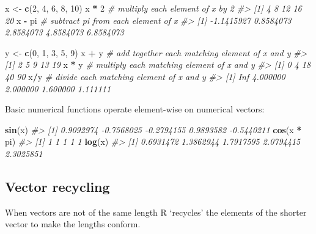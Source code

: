 \documentclass[]{book}
\newenvironment{Shaded}{\begin{snugshade}}{\end{snugshade}}
\newcommand{\CommentTok}[1]{\textcolor[rgb]{0.56,0.35,0.01}{\textit{#1}}}
\newcommand{\DecValTok}[1]{\textcolor[rgb]{0.00,0.00,0.81}{#1}}
\newcommand{\KeywordTok}[1]{\textcolor[rgb]{0.13,0.29,0.53}{\textbf{#1}}}
\newcommand{\NormalTok}[1]{#1}
\newcommand{\OperatorTok}[1]{\textcolor[rgb]{0.81,0.36,0.00}{\textbf{#1}}}
\newcommand{\StringTok}[1]{\textcolor[rgb]{0.31,0.60,0.02}{#1}}
\theoremstyle{definition}
\theoremstyle{definition}
\theoremstyle{definition}
\theoremstyle{remark}
\begin{document}
\begin{Shaded}
\begin{Highlighting}[]
\NormalTok{x <-}\StringTok{ }\KeywordTok{c}\NormalTok{(}\DecValTok{2}\NormalTok{, }\DecValTok{4}\NormalTok{, }\DecValTok{6}\NormalTok{, }\DecValTok{8}\NormalTok{, }\DecValTok{10}\NormalTok{)}
\NormalTok{x }\OperatorTok{*}\StringTok{ }\DecValTok{2}  \CommentTok{# multiply each element of x by 2}
\CommentTok{#> [1]  4  8 12 16 20}
\NormalTok{x }\OperatorTok{-}\StringTok{ }\NormalTok{pi }\CommentTok{# subtract pi from each element of x}
\CommentTok{#> [1] -1.1415927  0.8584073  2.8584073  4.8584073  6.8584073}

\NormalTok{y <-}\StringTok{ }\KeywordTok{c}\NormalTok{(}\DecValTok{0}\NormalTok{, }\DecValTok{1}\NormalTok{, }\DecValTok{3}\NormalTok{, }\DecValTok{5}\NormalTok{, }\DecValTok{9}\NormalTok{)}
\NormalTok{x }\OperatorTok{+}\StringTok{ }\NormalTok{y  }\CommentTok{# add together each matching element of x and y}
\CommentTok{#> [1]  2  5  9 13 19}
\NormalTok{x }\OperatorTok{*}\StringTok{ }\NormalTok{y }\CommentTok{# multiply each matching element of x and y}
\CommentTok{#> [1]  0  4 18 40 90}
\NormalTok{x}\OperatorTok{/}\NormalTok{y }\CommentTok{# divide each matching element of x and y}
\CommentTok{#> [1]      Inf 4.000000 2.000000 1.600000 1.111111}
\end{Highlighting}
\end{Shaded}

Basic numerical functions operate element-wise on numerical vectors:

\begin{Shaded}
\begin{Highlighting}[]
\KeywordTok{sin}\NormalTok{(x)}
\CommentTok{#> [1]  0.9092974 -0.7568025 -0.2794155  0.9893582 -0.5440211}
\KeywordTok{cos}\NormalTok{(x }\OperatorTok{*}\StringTok{ }\NormalTok{pi)}
\CommentTok{#> [1] 1 1 1 1 1}
\KeywordTok{log}\NormalTok{(x)}
\CommentTok{#> [1] 0.6931472 1.3862944 1.7917595 2.0794415 2.3025851}
\end{Highlighting}
\end{Shaded}

\hypertarget{vector-recycling}{%
\subsection{Vector recycling}\label{vector-recycling}}

When vectors are not of the same length R `recycles' the elements of the
shorter vector to make the lengths conform.
\end{document}
